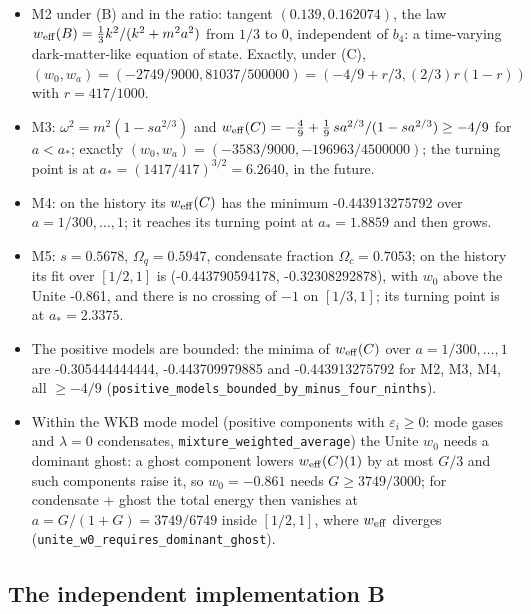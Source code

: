 \documentclass[11pt]{article}
\begin{document}
\begin{itemize}
\item M2 under (B) and in the ratio: tangent $(0.139, 0.162074)$, the law $w_{\rm eff}(B) = \frac13k^2/(k^2 + m^2a^2)$ from $1/3$ to 0, independent of $b_4$: a time-varying dark-matter-like equation of state. Exactly, under (C), $(w_0, w_a) = (-2749/9000, 81037/500000) = (-4/9 + r/3, (2/3)r(1 - r))$ with $r = 417/1000$.
\item M3: $\omega^2 = m^2(1 - sa^{2/3})$ and $w_{\rm eff}(C) = -\frac49 + \frac19\,sa^{2/3}/(1 - sa^{2/3}) \geq -4/9$ for $a < a_*$; exactly $(w_0, w_a) = (-3583/9000, -196963/4500000)$; the turning point is at $a_* = (1417/417)^{3/2} = 6.2640$, in the future.
\item M4: on the history its $w_{\rm eff}(C)$ has the minimum -0.443913275792 over $a = 1/300, \dots, 1$; it reaches its turning point at $a_* = 1.8859$ and then grows.
\item M5: $s = 0.5678$, $\Omega_q = 0.5947$, condensate fraction $\Omega_c = 0.7053$; on the history its fit over $[1/2, 1]$ is (-0.443790594178, -0.32308292878), with $w_0$ above the Unite -0.861, and there is no crossing of $-1$ on $[1/3, 1]$; its turning point is at $a_* = 2.3375$.
\item The positive models are bounded: the minima of $w_{\rm eff}(C)$ over $a = 1/300, \dots, 1$ are -0.305444444444, -0.443709979885 and -0.443913275792 for M2, M3, M4, all $\geq -4/9$ (\texttt{positive\allowbreak{}\_models\_\allowbreak{}bounded\_\allowbreak{}by\_minus\allowbreak{}\_four\_ni\allowbreak{}nths}).
\item Within the WKB mode model (positive components with $\varepsilon_i \geq 0$: mode gases and $\lambda = 0$ condensates, \texttt{mixture\_\allowbreak{}weighted\allowbreak{}\_average}) the Unite $w_0$ needs a dominant ghost: a ghost component lowers $w_{\rm eff}(C)(1)$ by at most $G/3$ and such components raise it, so $w_0 = -0.861$ needs $G \geq 3749/3000$; for condensate + ghost the total energy then vanishes at $a = G/(1 + G) = 3749/6749$ inside $[1/2, 1]$, where $w_{\rm eff}$ diverges (\texttt{unite\_w0\allowbreak{}\_require\allowbreak{}s\_domina\allowbreak{}nt\_ghost}).
\end{itemize}

\subsection{The independent implementation B}
\end{document}
